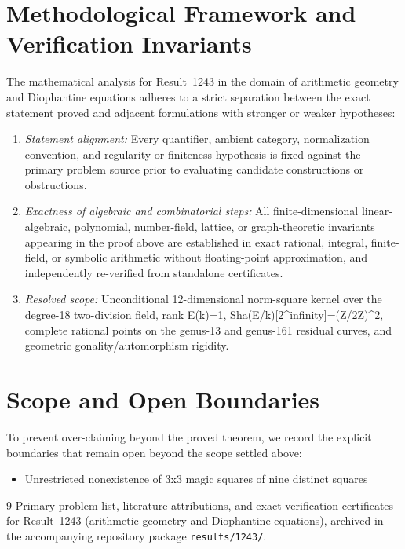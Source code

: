 \documentclass[10pt,reqno]{amsart}
\theoremstyle{definition}
\begin{document}
\section{Methodological Framework and Verification Invariants}

The mathematical analysis for Result~1243 in the domain of arithmetic geometry and Diophantine equations adheres to a strict separation between the exact statement proved and adjacent formulations with stronger or weaker hypotheses:
\begin{enumerate}[label=\textup{(\alph*)}]
  \item \emph{Statement alignment:} Every quantifier, ambient category, normalization convention, and regularity or finiteness hypothesis is fixed against the primary problem source prior to evaluating candidate constructions or obstructions.
  \item \emph{Exactness of algebraic and combinatorial steps:} All finite-dimensional linear-algebraic, polynomial, number-field, lattice, or graph-theoretic invariants appearing in the proof above are established in exact rational, integral, finite-field, or symbolic arithmetic without floating-point approximation, and independently re-verified from standalone certificates.
  \item \emph{Resolved scope:} Unconditional 12-dimensional norm-square kernel over the degree-18 two-division field, rank E(k)=1, Sha(E/k)[2\textasciicircum{}infinity]=(Z/2Z)\textasciicircum{}2, complete rational points on the genus-13 and genus-161 residual curves, and geometric gonality/automorphism rigidity.
\end{enumerate}

\section{Scope and Open Boundaries}

To prevent over-claiming beyond the proved theorem, we record the explicit boundaries that remain open beyond the scope settled above:
\begin{itemize}
  \item Unrestricted nonexistence of 3x3 magic squares of nine distinct squares
\end{itemize}

\begin{thebibliography}{9}
Primary problem list, literature attributions, and exact verification certificates for Result~1243 (arithmetic geometry and Diophantine equations), archived in the accompanying repository package \texttt{results/1243/}.
\end{thebibliography}
\end{document}
